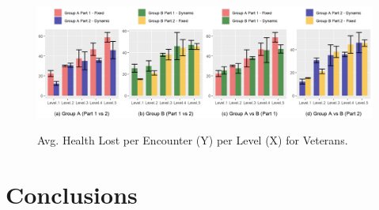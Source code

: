 \begin{figure}[!ht]
    \begin{center}
    \caption{Avg. Health Lost per Encounter (Y) per Level (X) for Veterans.}
        \includegraphics[width=34em]{figures/health_lost_per_encounter-veteran_players.png}
        \label{fig:result-metric-veterans-health-lost-per-encounter}
    \end{center}
\end{figure}


\section{Conclusions}






